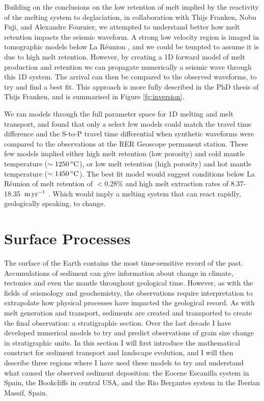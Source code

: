 Building on the conclusions on the low retention of melt implied by the reactivity of the melting system to deglaciation, in collaboration with Thijs Franken, Nobu Fuji, and Alexandre Fournier, we attempted to understand better how melt retention impacts the seismic waveform. A strong low velocity region is imaged in tomographic models below La Réunion \citep{mazzullo-etal-2017}, and we could be tempted to assume it is due to high melt retention. However, by creating a 1D forward model of melt production and retention we can propagate numerically a seismic wave through this 1D system. The arrival can then be compared to the observed waveforms, to try and find a best fit. This approach is more fully described in the PhD thesis of Thijs Franken, and is summarised in Figure \ref{fg:inversion}.

We ran models through the full parameter space for 1D melting and melt transport, and found that only a select few models could match the travel time difference and the S-to-P travel time differential when synthetic waveforms were compared to the observations at the RER Geoscope permanent station. These few models implied either high melt retention (low porosity) and cold mantle temperature ($\sim 1250\rm\,^{\circ}C$), or low melt retention (high porosity) and hot mantle temperature ($\sim 1450\rm\,^{\circ}C$). The best fit model would suggest conditions below La Réunion of melt retention of $<$0.28\% and high melt extraction rates of 8.37-18.35 $\rm\,m\,yr^{-1}$ \citep{franken-etal-2020}. Which would imply a melting system that can react rapidly, geologically speaking, to change.

\section{Surface Processes}

The surface of the Earth contains the most time-sensitive record of the past. Accumulations of sediment can give information about change in climate, tectonics and even the mantle throughout geological time. However, as with the fields of seismology and geochemistry, the observations require interpretation to extrapolate how physical processes have impacted the geological record. As with melt generation and transport, sediments are created and transported to create the final observation: a stratigraphic section. Over the last decade I have developed numerical models to try and predict observations of grain size change in stratigraphic units. In this section I will first introduce the mathematical construct for sediment transport and landscape evolution, and I will then describe three regions where I have used these models to try and understand what caused the observed sediment deposition: the Eocene Escanilla system in Spain, the Bookcliffs in central USA, and the Rio Bergantes system in the Iberian Massif, Spain.

